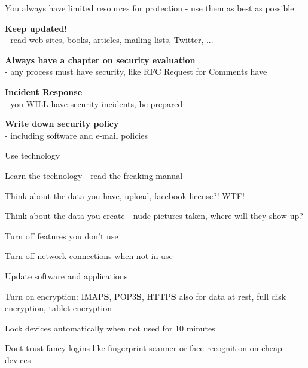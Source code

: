 \documentclass[Screen16to9,17pt]{foils}
\begin{document}

\begin{list1}
\item You always have limited resources for protection - use them as best as possible
\end{list1}




\begin{list1}
\item {\bf Keep updated!}\\ - read web sites, books, articles, mailing lists, Twitter, ...
\item {\bf Always have a chapter on security evaluation }\\ - any process must have security, like RFC Request for Comments have
\item {\bf Incident Response}\\ - you WILL have security incidents, be prepared
\item {\bf Write down security policy}\\ - including software and e-mail policies
\end{list1}



\begin{list1}
\item Use technology
\item Learn the technology - read the freaking manual
\item Think about the data you have, upload, facebook license?! WTF!
\item Think about the data you create - nude pictures taken, where will they show up?
\begin{list2}
\item Turn off features you don't use
\item Turn off network connections when not in use
\item Update software and applications
\item Turn on encryption: IMAP{\bf S}, POP3{\bf S},
  HTTP{\bf S} also for data at rest, full disk encryption, tablet encryption
\item Lock devices automatically when not used for 10 minutes
\item Dont trust fancy logins like fingerprint scanner or face recognition on cheap devices
\end{list2}
\end{list1}
\end{document}
